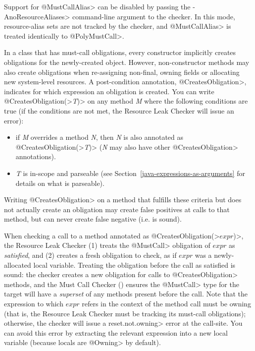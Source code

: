Support for \<@MustCallAlias> can be disabled by passing the \<-AnoResourceAliases> command-line
argument to the checker. In this mode, resource-alias sets are not tracked by the checker,
and \<@MustCallAlias> is treated identically to \<@PolyMustCall>.



In a class that has must-call obligations,
every constructor implicitly creates obligations for the newly-created object.
However, non-constructor methods may also create obligations
when re-assigning non-final, owning fields or allocating
new system-level resources.
A post-condition annotation,
\<@CreatesObligation>,
indicates for which expression an obligation is created.
You can write \<@CreatesObligation(>\emph{T}\<)> on any method \emph{M} where the following
conditions are true (if the conditions are not met, the Resource Leak Checker will issue an error):
\begin{itemize}
\item if \emph{M} overrides a method \emph{N}, then \emph{N} is also annotated as
\<@CreatesObligation(>\emph{T}\<)> (\emph{N} may also have other \<@CreatesObligation> annotations).
\item \emph{T} is in-scope and parseable (see Section~\ref{java-expressions-as-arguments} for details on
what is parseable).
\end{itemize}
Writing \<@CreatesObligation> on a method that fulfills these criteria but does not actually
create an obligation may create false positives at calls to that method, but can never create
false negative (i.e. is sound).

When checking a call to a method annotated as
\<@CreatesObligation(>$expr$\<)>, the Resource Leak Checker
(1) treats the \<@MustCall>
obligation of $expr$ as \emph{satisfied},
and (2) creates a fresh obligation to check, as if $expr$ was a newly-allocated local variable.
Treating the obligation before the call as satisfied is sound: the checker creates a new obligation for calls to
\<@CreatesObligation> methods, and the Must Call Checker () ensures the
\<@MustCall> type for the target will have a \emph{superset} of any methods present
before the call.
Note that the expression to which $expr$ refers in the context of the method call must be owning
(that is, the Resource Leak Checker must be tracking its must-call obligations); otherwise, the checker
will issue a \<reset.not.owning> error at the call-site. You can avoid this error by extracting the relevant
expression into a new local variable (because locals are \<@Owning> by default).

